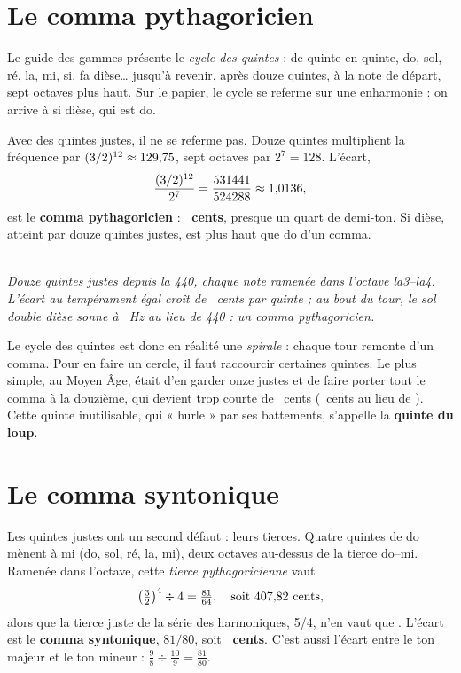 \documentclass[a4paper,11pt]{article}
\newcommand{\legende}[1]{\\[4pt]{\small\itshape\color{mygray} #1}}
\begin{document}
\section{Le comma pythagoricien}
\label{sec:comma-pyth}

Le guide des gammes présente le \emph{cycle des quintes} : de quinte en
quinte, do, sol, ré, la, mi, si, fa dièse\ldots{} jusqu'à revenir, après
douze quintes, à la note de départ, sept octaves plus haut. Sur le papier, le
cycle se referme sur une enharmonie : on arrive à si dièse, qui est do.

Avec des quintes justes, il ne se referme pas. Douze quintes multiplient la
fréquence par $(3/2)^{12} \approx 129{,}75$, sept octaves par
$2^7 = 128$. L'écart,
\[
  \frac{(3/2)^{12}}{2^7} = \frac{531441}{524288} \approx 1{,}0136 ,
\]
est le \textbf{comma pythagoricien} : \textbf{\commaPyth~cents}, presque un
quart de demi-ton. Si dièse, atteint par douze quintes justes, est plus haut
que do d'un comma.

\begin{center}

\legende{Douze quintes justes depuis la 440, chaque note ramenée dans l'octave
la3--la4. L'écart au tempérament égal croît de \ecartQuinte~cents par quinte ;
au bout du tour, le sol double dièse sonne à \spiraleFin~Hz au lieu de 440 :
un comma pythagoricien.}
\end{center}

Le cycle des quintes est donc en réalité une \emph{spirale} : chaque tour
remonte d'un comma. Pour en faire un cercle, il faut raccourcir certaines
quintes. Le plus simple, au Moyen Âge, était d'en garder onze justes et de
faire porter tout le comma à la douzième, qui devient trop courte de
\commaPyth~cents (\loupPyth~cents au lieu de \quinteJuste). Cette quinte
inutilisable, qui « hurle » par ses battements, s'appelle la \textbf{quinte
du loup}.

\section{Le comma syntonique}
\label{sec:comma-synt}

Les quintes justes ont un second défaut : leurs tierces. Quatre quintes de
do mènent à mi (do, sol, ré, la, mi), deux octaves au-dessus de la tierce
do--mi. Ramenée dans l'octave, cette \emph{tierce pythagoricienne} vaut
\[
  \left(\tfrac32\right)^4 \div 4 = \tfrac{81}{64}, \quad\text{soit
  407{,}82~cents},
\]
alors que la tierce juste de la série des harmoniques, 5/4, n'en vaut que
\tierceJuste. L'écart est le \textbf{comma syntonique}, $81/80$, soit
\textbf{\commaSynt~cents}. C'est aussi l'écart entre le ton majeur et le ton
mineur : $\tfrac98 \div \tfrac{10}9 = \tfrac{81}{80}$.
\end{document}
